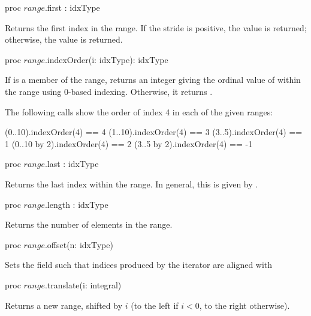 \begin{protohead}
proc $range$.first : idxType
\end{protohead}
\begin{protobody}
Returns the first index in the range.  If the stride is positive, the 
 value is returned; otherwise, the  value is returned.
\end{protobody}

\begin{protohead}
proc $range$.indexOrder(i: idxType): idxType
\end{protohead}
\begin{protobody}
If  is a member of the range, returns an integer giving
the ordinal value of  within the range using 0-based indexing.
Otherwise, it returns .
\end{protobody}

\begin{example}
The following calls show the order of index 4 in each of the given
ranges:
\begin{chapel}
(0..10).indexOrder(4) == 4
(1..10).indexOrder(4) == 3
(3..5).indexOrder(4) == 1
(0..10 by 2).indexOrder(4) == 2
(3..5 by 2).indexOrder(4) == -1
\end{chapel}
\end{example}
\begin{protohead}

proc $range$.last : idxType
\end{protohead}
\begin{protobody}
Returns the last index within the range.  In general, this is given
by .
\end{protobody}

\begin{protohead}
proc $range$.length : idxType
\end{protohead}
\begin{protobody}
Returns the number of elements in the range.
\end{protobody}

\label{Range_Offset_Method}
\begin{protohead}
proc $range$.offset(n: idxType)
\end{protohead}
\begin{protobody}
Sets the  field such that indices produced by the iterator are
aligned with 
\end{protobody}

\begin{protohead}
proc $range$.translate(i: integral)
\end{protohead}
\begin{protobody}
Returns a new range, shifted by $i$ (to the left if $i < 0$, to the right otherwise).
\end{protobody}


